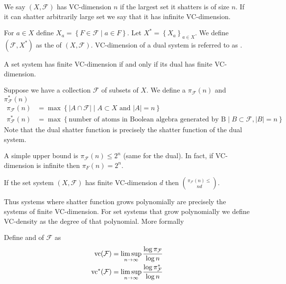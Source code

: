 \documentclass{amsart}
\newcommand{\F}{\mathcal F}
\newcommand{\curly}[1]{\left\{#1\right\}}
\begin{document}
\begin{Definition}
  We say $(X, \F)$ has VC-dimension $n$ if the largest set it shatters is of size $n$.
  If it can shatter arbitrarily large set we say that it has infinite VC-dimension.
\end{Definition}  

\begin{Definition}
  For $a \in X$ define $X_a = \curly{F \in \F \mid a \in F}$.
  Let $X^* = \curly{X_a}_{a \in X}$.
  We define $(\F, X^*)$ as the  of $(X, \F)$.
  VC-dimension of a dual system is referred to as .
\end{Definition}  


\begin{Lemma}
    A set system has finite VC-dimension if and only if its dual has finite VC-dimension.
\end{Lemma}  

\begin{Definition}
    Suppose we have a collection $\F$ of subsets of $X$.
    We define a  $\pi_\F(n)$ and  $\pi^*_\F(n)$
    \begin{align*}
            \pi_\F(n) &= \max \curly{|A \cap \F| \mid A \subset X \text{ and } |A| = n} \\
            \pi^*_\F(n) &= \max \curly{\text{number of atoms in Boolean algebra generated by B} \mid B \subset \F, |B| = n}
    \end{align*}
    Note that the dual shatter function is precisely the shatter function of the dual system.
\end{Definition}  

A simple upper bound is $\pi_\F(n) \leq 2^n$ (same for the dual).
In fact, if VC-dimension is infinite then $\pi_F(n) = 2^n$.

\begin{Theorem} 
  If the set system $(X, \F)$ has finite VC-dimension $d$ then $\pi_\F(n) \leq \choose{n}{d}$.    
\end{Theorem}

Thus systems where shatter function grows polynomially are precisely the systems of finite VC-dimension.
For set systems that grow polynomially we define VC-density as the degree of that polynomial.
More formally

\begin{Definition}
  Define  and  of $\F$ as
  \begin{align*}
          \vc(\F) &= \limsup_{n \to \infty}\frac{\log \pi_\F}{\log n} \\
          \vc^*(\F) &= \limsup_{n \to \infty}\frac{\log \pi^*_\F}{\log n}
  \end{align*}
\end{Definition}
\end{document}
